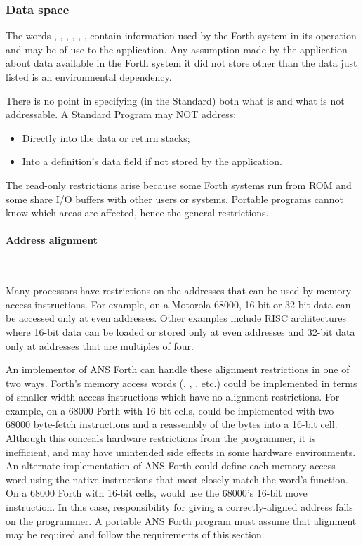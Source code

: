 \subsubsection{Data space} %
\label{rat:dataspace}

The words , , , ,
, ,   contain information
used by the Forth system in its operation and may be of use to the
application. Any assumption made by the application about data
available in the Forth system it did not store other than the data
just listed is an environmental dependency.

There is no point in specifying (in the Standard) both what is and
what is not addressable. A Standard Program may NOT address:

\begin{itemize}
\item Directly into the data or return stacks;
\item Into a definition's data field if not stored by the application.
\end{itemize}

The read-only restrictions arise because some Forth systems run from
ROM and some share I/O buffers with other users or systems. Portable
programs cannot know which areas are affected, hence the general
restrictions.

\paragraph{Address alignment} ~ %

Many processors have restrictions on the addresses that can be used
by memory access instructions. For example, on a Motorola 68000,
16-bit or 32-bit data can be accessed only at even addresses. Other
examples include RISC architectures where 16-bit data can be loaded
or stored only at even addresses and 32-bit data only at addresses
that are multiples of four.

An implementor of ANS Forth can handle these alignment restrictions
in one of two ways. Forth's memory access words (, \word{!},
\word{+!}, etc.) could be implemented in terms of smaller-width access
instructions which have no alignment restrictions. For example, on a
68000 Forth with 16-bit cells,  could be implemented with two
68000 byte-fetch instructions and a reassembly of the bytes into a
16-bit cell. Although this conceals hardware restrictions from the
programmer, it is inefficient, and may have unintended side effects
in some hardware environments. An alternate implementation of ANS Forth
could define each memory-access word using the native instructions
that most closely match the word's function. On a 68000 Forth with
16-bit cells,  would use the 68000's 16-bit move instruction.
In this case, responsibility for giving  a correctly-aligned
address falls on the programmer. A portable ANS Forth program must
assume that alignment may be required and follow the requirements of
this section.

